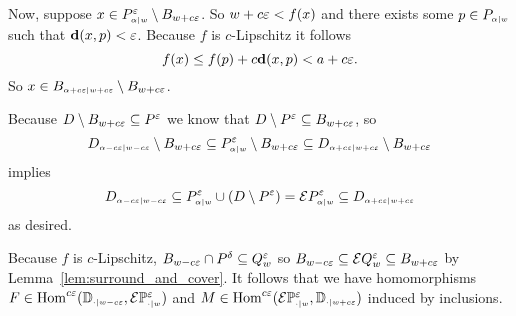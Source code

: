   Now, suppose $x\in P\subi{w}{\alpha}^\e\setminus B_{w+c\e}$.
  So $w+c\e < f(x)$ and there exists some $p\in P\subi{w}{\alpha}$ such that $\dist(x,p) < \e$.
  Because $f$ is $c$-Lipschitz it follows
  \[ f(x) \leq f(p) + c\dist(x,p) < a + c\e.\]
  So $x\in B\subi{w+c\e}{\alpha+c\e}\setminus B_{w+c\e}$.

  Because $D\setminus B_{w+c\e}\subseteq P^\e$ we know that $D\setminus P^\e \subseteq B_{w+c\e}$, so
  \[D\subi{w-c\e}{\alpha-c\e}\setminus B_{w+c\e} \subseteq P\subi{w}{\alpha}^\e\setminus B_{w+c\e}\subseteq D\subi{w+c\e}{\alpha+c\e}\setminus B_{w+c\e}\]
  implies
  \[ D\subi{w-c\e}{\alpha-c\e}\subseteq P\subi{w}{\alpha}^\e\cup (D\setminus P^\e) = \ext{P\subi{w}{\alpha}^\e} \subseteq D\subi{w+c\e}{\alpha+c\e} \]
  as desired.

  Because $f$ is $c$-Lipschitz, $B_{w-c\e}\cap P^\delta\subseteq Q_{w}^\e$ so $B_{w-c\e} \subseteq \E Q_w^\e\subseteq B_{w+c\e}$ by Lemma~\ref{lem:surround_and_cover}.
  It follows that we have homomorphisms $F\in \Hom^{c\e}(\DD{w-c\e}, \E\PP{w}{\e})$ and $M\in\Hom^{c\e}(\E\PP{w}{\e}, \DD{w+c\e})$ induced by inclusions.
\endproofatend
